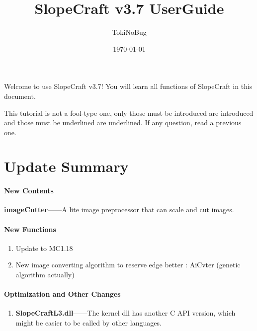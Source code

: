 \documentclass{article}
\title{SlopeCraft v3.7 UserGuide}
\author{TokiNoBug}
\date{\today}
\begin{document}
    \maketitle
    Welcome to use SlopeCraft v3.7! You will learn all functions of SlopeCraft in this document.

    This tutorial is not a fool-type one, only those must be introduced are introduced and those must be underlined are underlined. If any question, read a previous one.

    \section{Update Summary}
    \paragraph{New Contents}

    \textbf{imageCutter}——A lite image preprocessor that can scale and cut images.

    \paragraph{New Functions}
    \begin{enumerate}
        \item Update to MC1.18
        \item New image converting algorithm to reserve edge better : AiCvter (genetic algorithm actually)
    \end{enumerate}

    \paragraph{Optimization and Other Changes}
    \begin{enumerate}
        \item \textbf{SlopeCraftL3.dll}——The kernel dll has another C API version, which might be easier to be called by other languages.
    \end{enumerate}
\end{document}
